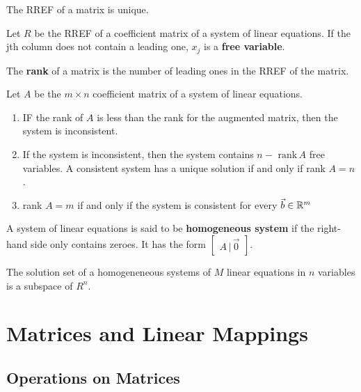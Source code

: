 \documentclass[english, 12pt]{article}
\begin{document}
\begin{thrm}
The RREF of a matrix is unique.
\end{thrm}

\begin{defn}
Let $R$ be the RREF of a coefficient matrix of a system of linear equations. If the jth column does not contain a leading one, $x_{j}$ is a \textbf{free variable}.
\end{defn}

\begin{defn}
The \textbf{rank} of a matrix is the number of leading ones in the RREF of the matrix.
\end{defn}

\begin{thrm}
Let $A$ be the $m \times n$ coefficient matrix of a system of linear equations.
\begin{enumerate}
\item IF the rank of $A$ is less than the rank for the augmented matrix, then the system is inconsistent.
\item If the system is inconsistent, then the system contains $n - \text{ rank}\,A$ free variables. A consistent system has a unique solution if and only if rank $A=n$.
\item rank $A=m$ if and only if the system is consistent for every $\vec{b} \in {\mathbb{R}}^m$
\end{enumerate}
\end{thrm}

\begin{defn}
A system of linear equations is said to be \textbf{homogeneous system} if the right-hand side only contains zeroes. It has the form $\begin{bmatrix} A\, |\, \vec{0} \end{bmatrix}$.
\end{defn}

\begin{thrm}
The solution set of a homogeneneous systems of $M$ linear equations in $n$ variables is a subspace of $R^n$.
\end{thrm}

\section{Matrices and Linear Mappings}

\subsection{Operations on Matrices}
\end{document}
